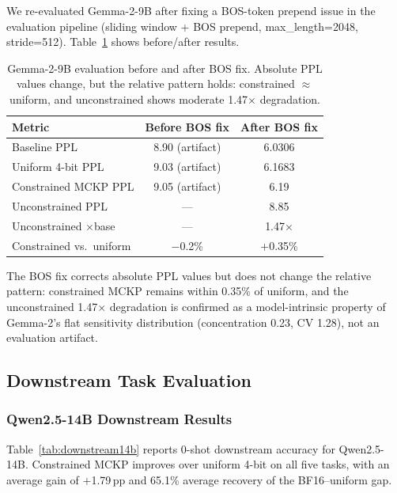 \documentclass[11pt,a4paper]{article}
\newcommand{\pp}{\,\text{pp}}
\begin{document}
We re-evaluated Gemma-2-9B after fixing a BOS-token prepend issue in the evaluation pipeline (sliding window + BOS prepend, max\_length=2048, stride=512).
Table~\ref{tab:gemma2bos} shows before/after results.

\begin{table}[h]
\centering
\caption{Gemma-2-9B evaluation before and after BOS fix. Absolute PPL values change, but the relative pattern holds: constrained $\approx$ uniform, and unconstrained shows moderate 1.47$\times$ degradation.}
\label{tab:gemma2bos}
\begin{tabular}{lcc}
\toprule
\textbf{Metric} & \textbf{Before BOS fix} & \textbf{After BOS fix} \\
\midrule
Baseline PPL          & 8.90 (artifact) & 6.0306         \\
Uniform 4-bit PPL     & 9.03 (artifact) & 6.1683         \\
Constrained MCKP PPL  & 9.05 (artifact) & 6.19           \\
Unconstrained PPL     & ---             & 8.85           \\
Unconstrained $\times$base & ---        & 1.47$\times$   \\
Constrained vs.\ uniform & $-$0.2\%    & $+$0.35\%      \\
\bottomrule
\end{tabular}
\end{table}

The BOS fix corrects absolute PPL values but does not change the relative pattern: constrained MCKP remains within 0.35\% of uniform, and the unconstrained 1.47$\times$ degradation is confirmed as a model-intrinsic property of Gemma-2's flat sensitivity distribution (concentration 0.23, CV 1.28), not an evaluation artifact.

\subsection{Downstream Task Evaluation}
\label{sec:downstream}

\subsubsection{Qwen2.5-14B Downstream Results}

Table~\ref{tab:downstream14b} reports 0-shot downstream accuracy for Qwen2.5-14B.
Constrained MCKP improves over uniform 4-bit on all five tasks, with an average gain of $+$1.79$\pp$ and 65.1\% average recovery of the BF16--uniform gap.
\end{document}
